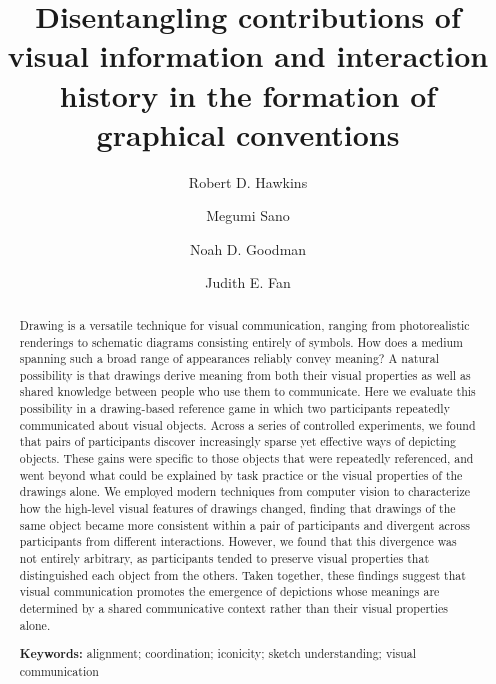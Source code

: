 \documentclass[11pt,letterpaper]{article}
\title{Disentangling contributions of visual information and interaction history in the formation of graphical conventions}
\date{}
\author[a,d]{Robert D. Hawkins}
\author[a]{Megumi Sano}
\author[a,b]{Noah D. Goodman}
\author[a,c]{Judith E. Fan}
\affil[a]{Department of Psychology, Stanford University}
\affil[b]{Department of Computer Science, Stanford University}
\affil[c]{Department of Psychology, University of California, San Diego}
\affil[d]{Department of Psychology, Princeton University}
\begin{document}
\maketitle

\begin{abstract}
Drawing is a versatile technique for visual communication, ranging from photorealistic renderings to schematic diagrams consisting entirely of symbols.
How does a medium spanning such a broad range of appearances reliably convey meaning?
A natural possibility is that drawings derive meaning from both their visual properties as well as shared knowledge between people who use them to communicate.
Here we evaluate this possibility in a drawing-based reference game in which two participants repeatedly communicated about visual objects.
Across a series of controlled experiments, we found that pairs of participants discover increasingly sparse yet effective ways of depicting objects.
These gains were specific to those objects that were repeatedly referenced, and went beyond what could be explained by task practice or the visual properties of the drawings alone.
We employed modern techniques from computer vision to characterize how the high-level visual features of drawings changed, finding that drawings of the same object became more consistent within a pair of participants and divergent across participants from different interactions.
However, we found that this divergence was not entirely arbitrary, as participants tended to preserve visual properties that distinguished each object from the others. 
Taken together, these findings suggest that visual communication promotes the emergence of depictions whose meanings are determined by a shared communicative context rather than their visual properties alone.

\textbf{Keywords:}
alignment; coordination; iconicity; sketch understanding; visual communication


\end{abstract}
\end{document}
